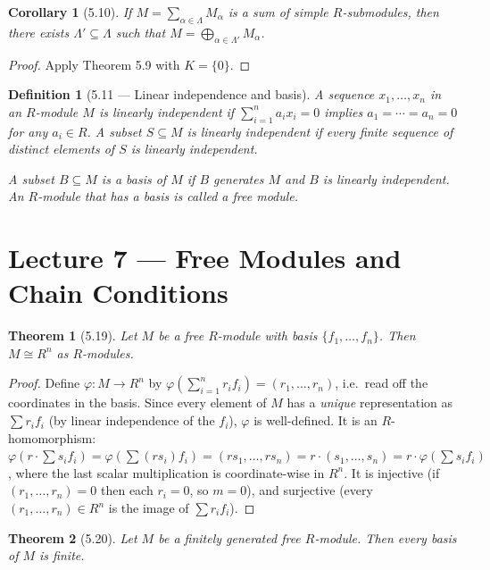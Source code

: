 \documentclass[12pt]{article}
\newtheorem{theorem}{Theorem}
\newtheorem{corollary}{Corollary}
\newtheorem{definition}{Definition}
\begin{document}
\begin{corollary}[5.10]
If $M = \sum_{\alpha \in \Lambda} M_\alpha$ is a sum of simple $R$-submodules, then there exists $\Lambda' \subseteq \Lambda$ such that $M = \bigoplus_{\alpha \in \Lambda'} M_\alpha$.
\end{corollary}

\begin{proof}
Apply Theorem 5.9 with $K = \{0\}$.
\end{proof}

\begin{definition}[5.11 — Linear independence and basis]
A sequence $x_1, \ldots, x_n$ in an $R$-module $M$ is \emph{linearly independent} if $\sum_{i=1}^n a_i x_i = 0$ implies $a_1 = \cdots = a_n = 0$ for any $a_i \in R$. A subset $S \subseteq M$ is linearly independent if every finite sequence of distinct elements of $S$ is linearly independent.

A subset $B \subseteq M$ is a \emph{basis} of $M$ if $B$ generates $M$ and $B$ is linearly independent. An $R$-module that has a basis is called a \emph{free module}.
\end{definition}

\section*{Lecture 7 — Free Modules and Chain Conditions}

\begin{theorem}[5.19]
Let $M$ be a free $R$-module with basis $\{f_1, \ldots, f_n\}$. Then $M \cong R^n$ as $R$-modules.
\end{theorem}

\begin{proof}
Define $\varphi : M \to R^n$ by $\varphi\!\left(\sum_{i=1}^n r_i f_i\right) = (r_1, \ldots, r_n)$, i.e.\ read off the coordinates in the basis. Since every element of $M$ has a \emph{unique} representation as $\sum r_i f_i$ (by linear independence of the $f_i$), $\varphi$ is well-defined. It is an $R$-homomorphism: $\varphi\!\left(r\cdot\sum s_i f_i\right) = \varphi\!\left(\sum (rs_i)f_i\right) = (rs_1,\ldots,rs_n) = r\cdot(s_1,\ldots,s_n) = r\cdot\varphi\!\left(\sum s_i f_i\right)$, where the last scalar multiplication is coordinate-wise in $R^n$. It is injective (if $(r_1,\ldots,r_n) = 0$ then each $r_i = 0$, so $m = 0$), and surjective (every $(r_1,\ldots,r_n) \in R^n$ is the image of $\sum r_i f_i$).
\end{proof}

\begin{theorem}[5.20]
Let $M$ be a finitely generated free $R$-module. Then every basis of $M$ is finite.
\end{theorem}
\end{document}
